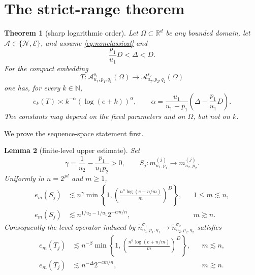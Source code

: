 \documentclass[11pt]{article}
\newtheorem{theorem}{Theorem}
\newtheorem{lemma}[theorem]{Lemma}
\newcommand{\N}{\mathbb N}
\newcommand{\R}{\mathbb R}
\begin{document}
\section{The strict-range theorem}

\begin{theorem}[sharp logarithmic order]\label{thm:main}
Let $\Omega\subset\R^d$ be any bounded domain, let
$\mathcal A\in\{\mathcal N,\mathcal E\}$, and assume
\eqref{eq:nonclassical} and
\begin{equation}\label{eq:strict}
 \frac{p_1}{u_1}D<\Delta<D.
\end{equation}
For the compact embedding
\[
 T:\mathcal A^{s_1}_{u_1,p_1,q_1}(\Omega)
 \longrightarrow
 \mathcal A^{s_2}_{u_2,p_2,q_2}(\Omega)
\]
one has, for every $k\in\N$,
\begin{equation}\label{eq:answer}
 e_k(T)\asymp
 k^{-\alpha}(\log(e+k))^\alpha,
 \qquad
 \alpha=\frac{u_1}{u_1-p_1}
 \left(\Delta-\frac{p_1}{u_1}D\right).
\end{equation}
The constants may depend on the fixed parameters and on $\Omega$, but not on
$k$.
\end{theorem}

We prove the sequence-space statement first.

\begin{lemma}[finite-level upper estimate]\label{lem:blockupper}
Set
\[
 \gamma=\frac1{u_2}-\frac{p_1}{u_1p_2}>0,
 \qquad
 S_j:m^{(j)}_{u_1,p_1}\longrightarrow m^{(j)}_{u_2,p_2}.
\]
Uniformly in $n=2^{jd}$ and $m\ge1$,
\begin{align}
 e_m(S_j)&\lesssim
 n^\gamma\min\left\{1,
 \left(\frac{n^a\log(e+n/m)}m\right)^D\right\},
 &&1\le m\lesssim n,\label{eq:blockmiddle}\\
 e_m(S_j)&\lesssim
 n^{1/u_2-1/u_1}2^{-c m/n},
 &&m\gtrsim n.\label{eq:blocklarge}
\end{align}
Consequently the level operator induced by
$\widetilde n^{\sigma_1}_{u_1,p_1,q_1}\to
\widetilde n^{\sigma_2}_{u_2,p_2,q_2}$ satisfies
\begin{align}
 e_m(T_j)&\lesssim
 n^{-\beta}\min\left\{1,
 \left(\frac{n^a\log(e+n/m)}m\right)^D\right\},
 &&m\lesssim n,\label{eq:weightedmiddle}\\
 e_m(T_j)&\lesssim n^{-\Delta}2^{-c m/n},
 &&m\gtrsim n.\label{eq:weightedlarge}
\end{align}
\end{lemma}
\end{document}
